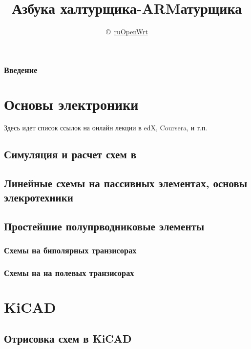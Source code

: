 

\author{\copyright\
\href{https://groups.google.com/forum/\#!forum/openwrt2ru}{ruOpenWrt}}
\title{Азбука халтурщика-ARMатурщика}


\maketitle
\tableofcontents

\section*{Введение}

\part{Основы электроники}

Здесь идет список ссылок на онлайн лекции в edX, Coursera, и т.п.

\chapter{Симуляция и расчет схем в \spice}

\chapter{Линейные схемы на пассивных элементах, основы элекротехники}

\chapter{Простейшие полупрводниковые элементы}

\section{Схемы на биполярных транзисорах} 

\section{Схемы на на полевых транзисорах}

\part{KiCAD} 

\chapter{Отрисовка схем в KiCAD}

